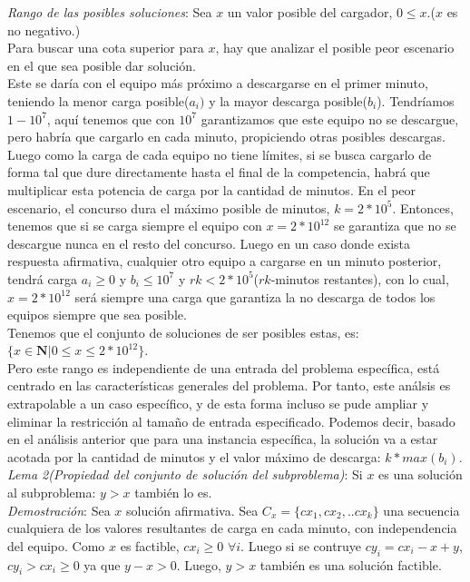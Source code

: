\documentclass{article}
\begin{document}
\textit{Rango de las posibles soluciones}: Sea $x$ un valor posible del cargador, $0\leq x$.($x$ es no negativo.)\\
Para buscar una cota superior para $x$, hay que analizar el posible peor escenario en el que sea posible dar soluci\'on.\\
Este se dar\'ia con el equipo m\'as pr\'oximo a descargarse en el primer minuto, teniendo la menor carga posible($a_i)$ y la mayor descarga posible($b_i$). Tendr\'iamos $1-10^{7}$, aqu\'i tenemos que con $10^7$ garantizamos que este equipo no se descargue, pero habr\'ia que cargarlo en cada minuto, propiciendo otras posibles descargas. Luego como la carga de cada equipo no tiene l\'imites, si se busca cargarlo de forma tal que dure directamente hasta el final de la competencia, habr\'a que multiplicar esta potencia de carga por la cantidad de minutos. En el peor escenario, el concurso dura el m\'aximo posible de minutos, $k=2*10^{5}$. Entonces, tenemos que si se carga siempre el equipo con $x=2*10^{12}$ se garantiza que no se descargue nunca en el resto del concurso. Luego en un caso donde exista respuesta afirmativa, cualquier otro equipo a cargarse en un minuto posterior, tendr\'a carga $a_i\geq 0$ y $b_i\leq 10^7$ y  $rk<2*10^5$($rk$-minutos restantes), con lo cual, $x=2*10^{12}$ ser\'a siempre una carga que garantiza la no descarga de todos los equipos siempre que sea posible.\\
Tenemos que el conjunto de soluciones de ser posibles estas, es: $\{x\in \mathbf{N} | 0\leq x \leq 2*10^{12}\}$.\\
Pero este rango es independiente de una entrada del problema espec\'ifica, est\'a centrado en las caracter\'isticas generales del problema. Por tanto, este an\'alsis es extrapolable a un caso espec\'ifico, y de esta forma incluso se pude ampliar y eliminar la restricci\'on al tama\~no de entrada especificado. Podemos decir, basado en el an\'alisis anterior que para una instancia espec\'ifica, la soluci\'on va a estar acotada por la cantidad de minutos y el valor m\'aximo de descarga: $k*max(b_i)$.\\


\textit{Lema 2(Propiedad del conjunto de soluci\'on del subproblema)}: Si $x$ es una soluci\'on al subproblema: $y>x$ tambi\'en lo es.\\
\textit{Demostraci\'on}: Sea $x$ soluci\'on afirmativa. Sea $C_x=\{cx_1, cx_2,..cx_k\}$ una secuencia cualquiera de los valores resultantes de carga en cada minuto, con independencia del equipo. Como $x$ es factible, $cx_i\geq 0$ $\forall i$. Luego si se contruye $cy_i=cx_i - x + y$, $cy_i > cx_i\geq 0$ ya que $y-x>0$. Luego, $y>x$ tambi\'en es una soluci\'on factible.\\
\end{document}
